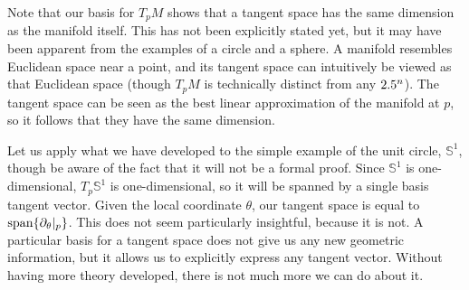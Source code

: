 \documentclass[a4paper,12pt]{article}
\begin{document}
Note that our basis for $T_p M$ shows that a tangent space has the same dimension as the manifold itself.
This has not been explicitly stated yet, but it may have been apparent from the examples of a circle and a sphere.
A manifold resembles Euclidean space near a point, and its tangent space can intuitively be viewed as that Euclidean space (though $T_p M$ is technically distinct from any $2.5^n$).
The tangent space can be seen as the best linear approximation of the manifold at $p$, so it follows that they have the same dimension.

Let us apply what we have developed to the simple example of the unit circle, $\mathbb{S}^1$, though be aware of the fact that it will not be a formal proof.
Since $\mathbb{S}^1$ is one-dimensional, $T_p \mathbb{S}^1$ is one-dimensional, so it will be spanned by a single basis tangent vector.
Given the local coordinate $\theta$, our tangent space is equal to $\operatorname{span}\{\eval*{\partial_\theta}{p}\}$.
This does not seem particularly insightful, because it is not.
A particular basis for a tangent space does not give us any new geometric information, but it allows us to explicitly express any tangent vector.
Without having more theory developed, there is not much more we can do about it.
\end{document}
